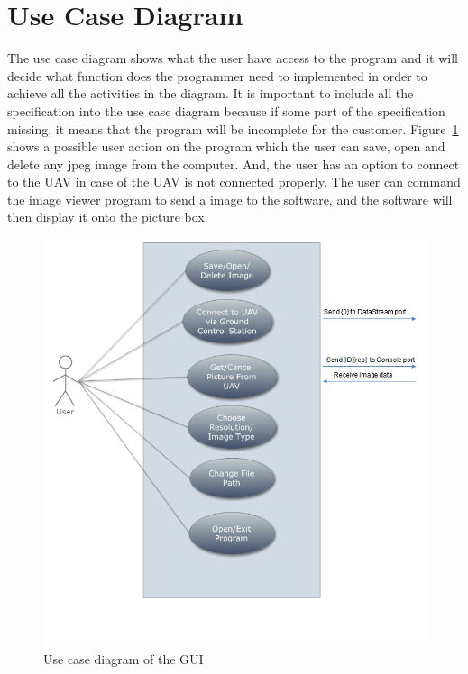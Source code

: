 \section{Use Case Diagram}
The use case diagram shows what the user have access to the program and it will decide what function does the programmer need to implemented in order to achieve all the activities in the diagram.
It is important to include all the specification into the use case diagram because if some part of the specification missing, it means that the program will be incomplete for the customer.
Figure~\ref{GUI_useCase} shows a possible user action on the program which the user can save, open and delete any jpeg image from the computer. 
And, the user has an option to connect to the UAV in case of the UAV is not connected properly.
The user can command the image viewer program to send a image to the software, and the software will then display it onto the picture box.
\begin{figure}[!hbtp]
\begin{center}
\includegraphics[scale=0.6]{figures/userCase.png} 
\end{center}
\caption{Use case diagram of the GUI\label{GUI_useCase}}
\end{figure}

